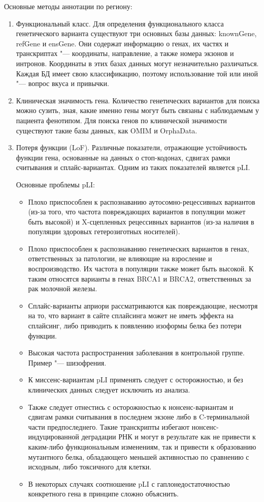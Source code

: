 \documentclass[a4paper,12pt]{article}
\begin{document}
Основные методы аннотации по региону:

\begin{enumerate}
\item Функциональный класс.
Для определения функционального класса генетического варианта существуют три основных базы данных: knownGene, refGene и ensGene.
Они содержат информацию о генах, их частях и транскриптах "--- координаты, направление, а также номера экзонов и интронов.
Координаты в этих базах данных могут незначительно различаться.
Каждая БД имеет свою классификацию, поэтому использование той или иной "--- вопрос вкуса и привычки.

\item Клиническая значимость гена.
Количество генетических вариантов для поиска можно сузить, зная, какие именно гены могут быть связаны с наблюдаемым у пациента фенотипом.
Для поиска генов по клинической значимости существуют такие базы данных, как OMIM и OrphaData.

\item Потеря функции (LoF).
Различные показатели, отражающие устойчивость функции гена, основанные на данных о стоп-кодонах, сдвигах рамки считывания и сплайс-вариантах.
Одним из таких показателей является pLI.

Основные проблемы pLI\cite{ziegler}:

\begin{itemize}
\item Плохо приспособлен к распознаванию аутосомно-рецессивных вариантов (из-за того, что частота повреждающих вариантов в популяции может быть высокой) и X-сцепленных рецессивных вариантов (из-за наличия в популяции здоровых гетерозиготных носителей).
\item Плохо приспособлен к распознаванию генетических вариантов в генах, ответственных за патологии, не влияющие на взросление и воспроизводство.
Их частота в популяции также может быть высокой.
К таким относятся варианты в генах BRCA1 и BRCA2, ответственных за рак молочной железы.
\item Сплайс-варианты априори рассматриваются как повреждающие, несмотря на то, что вариант в сайте сплайсинга может не иметь эффекта на сплайсинг, либо приводить к появлению изоформы белка без потери функции.
\item Высокая частота распространения заболевания в контрольной группе.
Пример "--- шизофрения.
\item К миссенс-вариантам pLI применять следует с осторожностью, и без клинических данных следует исключить из анализа.
\item Также следует отнестись с осторожностью к нонсенс-вариантам и сдвигам рамки считывания в последнем экзоне либо в C-терминальной части предпоследнего.
Такие транскрипты избегают нонсенс-индуцированной деградации РНК и могут в результате как не привести к каким-либо функциональным изменениям, так и привести к образованию мутантного белка, обладающего меньшей активностью по сравнению с исходным, либо токсичного для клетки.
\item В некоторых случаях соотношение pLI с гаплонедостаточностью конкретного гена в принципе сложно объяснить.
\end{itemize}


\end{enumerate}
\end{document}
